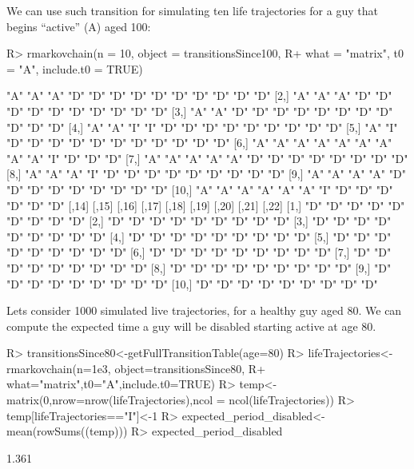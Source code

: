 \documentclass[
  nojss]{jss}
\begin{document}
We can use such transition for simulating ten life trajectories for a guy that begins ``active'' (A) aged 100:

\begin{CodeChunk}

\begin{CodeInput}
R> rmarkovchain(n = 10, object = transitionsSince100,
R+              what = "matrix", t0 = "A", include.t0 = TRUE)
\end{CodeInput}

\begin{CodeOutput}
      [,1] [,2] [,3] [,4] [,5] [,6] [,7] [,8] [,9] [,10] [,11] [,12] [,13]
 [1,] "A"  "A"  "A"  "D"  "D"  "D"  "D"  "D"  "D"  "D"   "D"   "D"   "D"  
 [2,] "A"  "A"  "A"  "D"  "D"  "D"  "D"  "D"  "D"  "D"   "D"   "D"   "D"  
 [3,] "A"  "A"  "D"  "D"  "D"  "D"  "D"  "D"  "D"  "D"   "D"   "D"   "D"  
 [4,] "A"  "A"  "I"  "I"  "D"  "D"  "D"  "D"  "D"  "D"   "D"   "D"   "D"  
 [5,] "A"  "I"  "D"  "D"  "D"  "D"  "D"  "D"  "D"  "D"   "D"   "D"   "D"  
 [6,] "A"  "A"  "A"  "A"  "A"  "A"  "A"  "A"  "A"  "I"   "D"   "D"   "D"  
 [7,] "A"  "A"  "A"  "A"  "A"  "D"  "D"  "D"  "D"  "D"   "D"   "D"   "D"  
 [8,] "A"  "A"  "A"  "I"  "D"  "D"  "D"  "D"  "D"  "D"   "D"   "D"   "D"  
 [9,] "A"  "A"  "A"  "A"  "D"  "D"  "D"  "D"  "D"  "D"   "D"   "D"   "D"  
[10,] "A"  "A"  "A"  "A"  "A"  "A"  "I"  "D"  "D"  "D"   "D"   "D"   "D"  
      [,14] [,15] [,16] [,17] [,18] [,19] [,20] [,21] [,22]
 [1,] "D"   "D"   "D"   "D"   "D"   "D"   "D"   "D"   "D"  
 [2,] "D"   "D"   "D"   "D"   "D"   "D"   "D"   "D"   "D"  
 [3,] "D"   "D"   "D"   "D"   "D"   "D"   "D"   "D"   "D"  
 [4,] "D"   "D"   "D"   "D"   "D"   "D"   "D"   "D"   "D"  
 [5,] "D"   "D"   "D"   "D"   "D"   "D"   "D"   "D"   "D"  
 [6,] "D"   "D"   "D"   "D"   "D"   "D"   "D"   "D"   "D"  
 [7,] "D"   "D"   "D"   "D"   "D"   "D"   "D"   "D"   "D"  
 [8,] "D"   "D"   "D"   "D"   "D"   "D"   "D"   "D"   "D"  
 [9,] "D"   "D"   "D"   "D"   "D"   "D"   "D"   "D"   "D"  
[10,] "D"   "D"   "D"   "D"   "D"   "D"   "D"   "D"   "D"  
\end{CodeOutput}
\end{CodeChunk}

Lets consider 1000 simulated live trajectories, for a healthy guy aged 80. We can compute the expected time a guy will be disabled starting active at age 80.

\begin{CodeChunk}

\begin{CodeInput}
R> transitionsSince80<-getFullTransitionTable(age=80)
R> lifeTrajectories<-rmarkovchain(n=1e3, object=transitionsSince80,
R+                                what="matrix",t0="A",include.t0=TRUE)
R> temp<-matrix(0,nrow=nrow(lifeTrajectories),ncol = ncol(lifeTrajectories))
R> temp[lifeTrajectories=="I"]<-1
R> expected_period_disabled<-mean(rowSums((temp)))
R> expected_period_disabled
\end{CodeInput}

\begin{CodeOutput}
[1] 1.361
\end{CodeOutput}
\end{CodeChunk}
\end{document}
